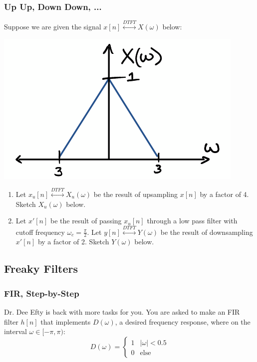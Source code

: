 \documentclass{article}
\begin{document}
\newpage
\subsubsection{Up Up, Down Down, ...}
Suppose we are given the signal $x[n] \overset{DTFT}{\longleftrightarrow} X(\omega)$ below: \\
\begin{center}
    \includegraphics[scale=0.25]{figures/simple-signal-1.png}
\end{center}

\begin{enumerate}
    \item Let $x_u[n] \overset{DTFT}{\longleftrightarrow} X_u(\omega)$ be the result of upsampling $x[n]$ by a factor of 4. Sketch $X_u(\omega)$ below. \vspace{2cm}
    \item Let $x'[n]$ be the result of passing $x_u[n]$ through a low pass filter with cutoff frequency $\omega_c=\frac{\pi}{2}$. Let $y[n] \overset{DTFT}{\longleftrightarrow} Y(\omega)$ be the result of downsampling $x'[n]$ by a factor of 2. Sketch $Y(\omega)$ below.\vspace{2cm} 
\end{enumerate}
\subsection{Freaky Filters}
\subsubsection{FIR, Step-by-Step}
Dr. Dee Efty is back with more tasks for you. You are asked to make an FIR filter $h[n]$ that implements $D(\omega)$, a desired frequency response, where on the interval $\omega \in [-\pi, \pi)$:
    \[
        D(\omega) = \begin{cases}
            1 & \vert \omega \vert < 0.5 \\
            0 & \text{else}
        \end{cases}
    \]
\end{document}
